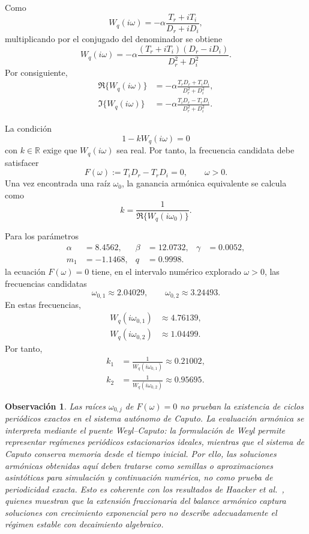 \documentclass[journal]{IEEEtran}
\newtheorem{remark}[theorem]{Observación}
\begin{document}
Como
\[
W_q(i\omega)
=
-\alpha\frac{T_r+iT_i}{D_r+iD_i},
\]
multiplicando por el conjugado del denominador se obtiene
\[
W_q(i\omega)
=
-\alpha
\frac{(T_r+iT_i)(D_r-iD_i)}{D_r^2+D_i^2}.
\]
Por consiguiente,
\begin{equation}
\label{eq:ReImW_ns}
\begin{aligned}
\Re\{W_q(i\omega)\}
&=
-\alpha
\frac{T_rD_r+T_iD_i}{D_r^2+D_i^2},\\
\Im\{W_q(i\omega)\}
&=
-\alpha
\frac{T_iD_r-T_rD_i}{D_r^2+D_i^2}.
\end{aligned}
\end{equation}

La condición
\[
1-kW_q(i\omega)=0
\]
con \(k\in\mathbb R\) exige que \(W_q(i\omega)\) sea real. Por tanto,
la frecuencia candidata debe satisfacer
\begin{equation}
\label{eq:Fomega_ns}
F(\omega)
:=
T_iD_r-T_rD_i
=
0,
\qquad
\omega>0.
\end{equation}
Una vez encontrada una raíz \(\omega_0\), la ganancia armónica equivalente se calcula como
\begin{equation}
\label{eq:k_omega_ns}
k
=
\frac{1}{\Re\{W_q(i\omega_0)\}}.
\end{equation}

Para los parámetros
\[
\begin{aligned}
\alpha&=8.4562, & \beta&=12.0732, & \gamma&=0.0052,\\
m_1&=-1.1468, & q&=0.9998.
\end{aligned}
\]
la ecuación \(F(\omega)=0\) tiene, en el intervalo numérico explorado
\(\omega>0\), las frecuencias candidatas
\[
\omega_{0,1}\approx 2.04029,
\qquad
\omega_{0,2}\approx 3.24493.
\]
En estas frecuencias,
\[
\begin{aligned}
W_q(i\omega_{0,1})&\approx 4.76139,\\
W_q(i\omega_{0,2})&\approx 1.04499.
\end{aligned}
\]
Por tanto,
\[
\begin{aligned}
k_1&=\frac{1}{W_q(i\omega_{0,1})}\approx 0.21002,\\
k_2&=\frac{1}{W_q(i\omega_{0,2})}\approx 0.95695.
\end{aligned}
\]

\begin{remark}
Las raíces $\omega_{0,j}$ de $F(\omega)=0$ no prueban la existencia de ciclos periódicos exactos en el sistema autónomo de Caputo. La evaluación armónica se interpreta mediante el puente Weyl--Caputo: la formulación de Weyl permite representar regímenes periódicos estacionarios ideales, mientras que el sistema de Caputo conserva memoria desde el tiempo inicial. Por ello, las soluciones armónicas obtenidas aquí deben tratarse como \emph{semillas o aproximaciones asintóticas} para simulación y continuación numérica, no como prueba de periodicidad exacta. Esto es coherente con los resultados de Haacker \emph{et al}.\ \cite{Haacker2026}, quienes muestran que la extensión fraccionaria del balance armónico captura soluciones con crecimiento exponencial pero no describe adecuadamente el régimen estable con decaimiento algebraico.
\end{remark}
\end{document}
